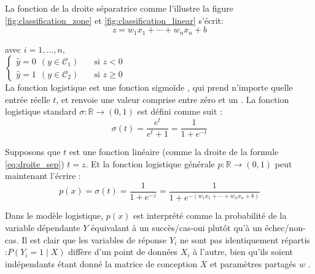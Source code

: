 		La fonction de la droite séparatrice comme l'illustre la figure \ref{fig:classification_zone} et \ref{fig:classification_linear} s'écrit:
		\begin{equation}\label{eq:droite_sep}
			z = w _{1}x_{1}+\cdots +w_{n}x_{n}+b
		\end{equation}
		
		avec $ i=1,\ldots ,n,$ %
		\\
		$
		\begin{cases}
			\hat{y}=0 \ \ (y \in \mathcal{C}_1) & \quad \text{si  } z < 0\\
			\hat{y}=1 \ \ (y \in \mathcal{C}_2) & \quad \text{si  } z \geq 0
		\end{cases}
		$\\
		
		
		
		
		La fonction logistique est une fonction sigmoïde , qui prend n'importe quelle entrée réelle $t$, et renvoie une valeur comprise entre zéro et un \cite{ml2008python}. La fonction logistique standard ${\displaystyle \sigma :\mathbb {R} \rightarrow (0,1)}$ est défini comme suit :
		\begin{equation} \label{eq:sigmoid-simple}
		\sigma (t)={\frac {e^{t}}{e^{t}+1}}={\frac {1}{1+e^{-t}}}
		\end{equation}
		
		Supposons que $t$ est une fonction linéaire (comme la droite de la formule \ref{eq:droite_sep}) $t = z$. Et la fonction logistique générale ${ p:\mathbb {R} \rightarrow (0,1)}$ peut maintenant l'écrire :
		\begin{equation}\label{eq:sigmoid-dev}
			{\displaystyle p(x)=\sigma (t)= {\frac {1}{1+e^{-z}}} ={\frac {1}{1+e^{-(w _{1}x_{1}+\cdots +w_{n}x_{n}+b)}}}}
		\end{equation} 
		
		
		
		Dans le modèle logistique, $p(x)$ est interprété comme la probabilité de la variable dépendante ${Y}$ équivalant à un succès/cas-oui plutôt qu'à un échec/non-cas. Il est clair que les variables de réponse $Y_{i}$ ne sont pas identiquement répartis :$P(Y_{i}=1\mid X)$ diffère d'un point de données $X_{i}$ à l'autre, bien qu'ils soient indépendants étant donné la matrice de conception $X$ et paramètres partagés $w$ \cite{antoine2018apprentissage}. 
		
